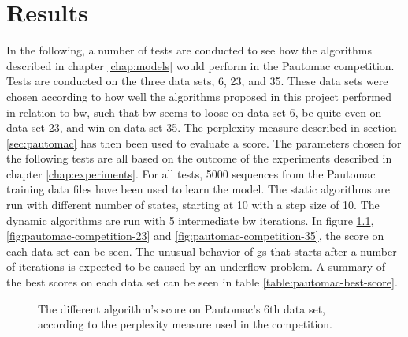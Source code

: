 \chapter{Results}
In the following, a number of tests are conducted to see how the algorithms described in chapter \ref{chap:models} would perform in the Pautomac competition. Tests are conducted on the three data sets, 6, 23, and 35. These data sets were chosen according to how well the algorithms proposed in this project performed in relation to \gls{bw}, such that \gls{bw} seems to loose on data set 6, be quite even on data set 23, and win on data set 35.
The perplexity measure described in section \ref{sec:pautomac} has then been used to evaluate a score.
The parameters chosen for the following tests are all based on the outcome of the experiments described in chapter \ref{chap:experiments}.
For all tests, 5000 sequences from the Pautomac training data files have been used to learn the model. The static algorithms are run with different number of states, starting at 10 with a step size of 10.
The dynamic algorithms are run with 5 intermediate \gls{bw} iterations.
In figure \ref{fig:pautomac-competition-6}, \ref{fig:pautomac-competition-23} and \ref{fig:pautomac-competition-35}, the score on each data set can be seen.
The unusual behavior of \gls{gs} that starts after a number of iterations is expected to be caused by an underflow problem.
A summary of the best scores on each data set can be seen in table \ref{table:pautomac-best-score}.


\begin{figure}
\centering
{}
\label{fig:pautomac-competition-6}\caption{The different algorithm's score on Pautomac's 6th data set, according to the perplexity measure used in the competition.}
\end{figure}

